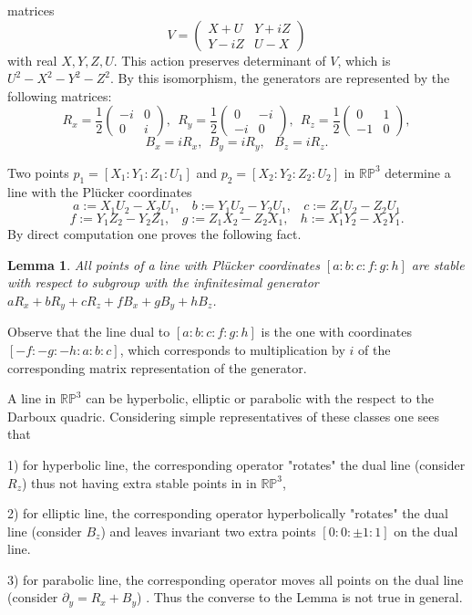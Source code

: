 \documentclass[11pt,a4paper]{article}
\newtheorem{lemma}[theorem]{Lemma}
\begin{document}
matrices
$$
V=\left(
\begin{array}{lll}
X+U & Y+iZ\\
Y-iZ & U-X
\end{array}
 \right)
$$ 
with real $X,Y,Z,U$. This action preserves determinant of $V$, which is $U^2-X^2-Y^2-Z^2$.
By this isomorphism, the generators are represented by the following matrices: 
$$
R_x=\frac{1}{2}\left(
\begin{array}{lll}
-i & 0\\
0 & i
\end{array}
 \right),\ \  
 R_y=\frac{1}{2}\left(
\begin{array}{lll}
0 & -i\\
-i & 0
\end{array}
 \right),\ \  
 R_z=\frac{1}{2}\left(
\begin{array}{lll}
0 & 1\\
-1 & 0
\end{array}
 \right),
$$
$$
B_x=iR_x,\ \ B_y=iR_y, \ \ \ B_z=iR_z.
$$ 

Two points $p_1=[X_1:Y_1:Z_1:U_1]$ and $p_2=[X_2:Y_2:Z_2:U_2]$ in $\mathbb{RP}^3$ determine a line with the Plücker coordinates 
$$
a:=X_1U_2-X_2U_1,\ \ \ \ b:=Y_1U_2-Y_2U_1, \ \ \ \  c:=Z_1U_2-Z_2U_1
$$
$$
f:=Y_1Z_2-Y_2Z_1,\ \ \ \ g:=Z_1X_2-Z_2X_1, \ \ \ \  h:=X_1Y_2-X_2Y_1. 
$$
By direct computation one proves the following fact.
\begin{lemma}
All points of a line with Plücker coordinates $[a:b:c:f:g:h]$ are stable with respect to subgroup with the infinitesimal generator $aR_x+bR_y+cR_z+fB_x+gB_y+hB_z$.  
\end{lemma}
Observe that the line dual to $[a:b:c:f:g:h]$ is the one with coordinates $[-f:-g:-h:a:b:c]$, which corresponds to multiplication by $i$ of the corresponding matrix representation of the generator. 

A line in $\mathbb{RP}^3$ can be hyperbolic, elliptic or parabolic with the respect to the Darboux quadric. Considering simple representatives of these classes one sees that 

1) for hyperbolic line, the corresponding operator "rotates"  the dual line (consider $R_z$) thus not having extra stable points in in $\mathbb{RP}^3$,

2) for elliptic line, the corresponding operator hyperbolically "rotates" the dual line (consider $B_z$) and leaves invariant two extra points $[0:0:\pm1:1]$ on the dual line. 

3) for parabolic line, the corresponding operator moves all points on the dual line (consider $\partial_y=R_x+B_y$) .
Thus the converse to the Lemma is not true in general. 
\end{document}
